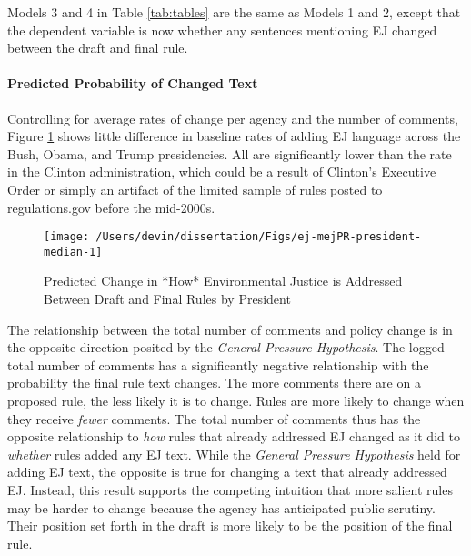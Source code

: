 \documentclass[
      12pt,
        ]{article}
\begin{document}
Models 3 and 4 in Table \ref{tab:tables} are the same as Models 1 and 2, except that the dependent variable is now whether any sentences mentioning EJ changed between the draft and final rule.

\hypertarget{predicted-probability-of-changed-text}{%
\paragraph{Predicted Probability of Changed Text}\label{predicted-probability-of-changed-text}}

Controlling for average rates of change per agency and the number of comments, Figure \ref{fig:ej-mejPR-president-median-1} shows little difference in baseline rates of adding EJ language across the Bush, Obama, and Trump presidencies. All are significantly lower than the rate in the Clinton administration, which could be a result of Clinton's Executive Order or simply an artifact of the limited sample of rules posted to regulations.gov before the mid-2000s.

\begin{figure}

{\centering \texttt{[image: /Users/devin/dissertation/Figs/ej-mejPR-president-median-1]} 

}

\caption{Predicted Change in *How* Environmental Justice is Addressed Between Draft and Final Rules by President}\label{fig:ej-mejPR-president-median-1}
\end{figure}

The relationship between the total number of comments and policy change is in the opposite direction posited by the \emph{General Pressure Hypothesis}. The logged total number of comments has a significantly negative relationship with the probability the final rule text changes. The more comments there are on a proposed rule, the less likely it is to change. Rules are more likely to change when they receive \emph{fewer} comments. The total number of comments thus has the opposite relationship to \emph{how} rules that already addressed EJ changed as it did to \emph{whether} rules added any EJ text. While the \emph{General Pressure Hypothesis} held for adding EJ text, the opposite is true for changing a text that already addressed EJ. Instead, this result supports the competing intuition that more salient rules may be harder to change because the agency has anticipated public scrutiny. Their position set forth in the draft is more likely to be the position of the final rule.
\end{document}
